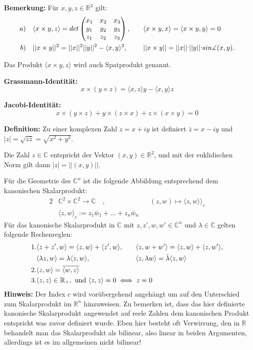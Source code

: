 \documentclass{article}
\let\oldcdot\cdot
\renewcommand{\cdot}{\raisebox{0.1ex}{$\oldcdot$}}
\begin{document}
\textbf{Bemerkung:} Für $x,y,z\in\mathbb{R}^3$ gilt:
\begin{alignat*}{2}
	a)\quad&\langle x\times y, z\rangle=det
	\begin{pmatrix}
		x_1&x_2&x_3\\
		y_1&y_2&y_3\\
		z_1&z_2&z_3
	\end{pmatrix},\quad&&
	\langle x\times y,x\rangle = \langle x\times y, y\rangle =0\\
	b)\quad&||x\times y||^2=||x||^2||y||^2-\langle x,y\rangle^2, && 
	||x\times y||=||x||\cdot||y||\cdot sin\measuredangle(x,y).
\end{alignat*}

Das Produkt $\langle x\times y,z\rangle$ wird auch Spatprodukt genannt.

\textbf{Grassmann-Identität:}
\begin{equation*}
	x\times (y\times z) = \langle x,z\rangle y - \langle x,y\rangle z
\end{equation*}

\textbf{Jacobi-Identität:}
\begin{equation*}
	x\times(y\times z)+y\times(z\times x)+z\times(x\times y)=0
\end{equation*}

\textbf{Definition:} Zu einer komplexen Zahl $z=x+iy$ ist definiert
$\bar{z}=x-iy$ und $|z|=\sqrt{z\bar{z}} =\sqrt{x^2+y^2}$. 

Die Zahl $z\in\mathbb{C}$ entspricht der Vektor $(x,y)\in\mathbb{R}^2$, und mit
der euklidischen Norm gilt dann $|z|=||(x,y)||$.

Für die Geometrie des $\mathbb{C}^n$ ist die folgende Abbildung entsprechend
dem kanonischen Skalarprodukt:
\begin{alignat*}{2}
	&\mathbb{C}^2\times \mathbb{C}^2\to\mathbb{C}\quad, &&
	(z,w)\mapsto\langle z,w\rangle\rangle_c\\
	&\langle z,w\rangle_c:=z_1\bar{w}_1+\dots+z_n\bar{w}_n
\end{alignat*}
Für das kanonische Skalarprodukt in $\mathbb{C}$ mit $z,z',w,w'\in\mathbb{C}^n$
und $\lambda\in\mathbb{C}$ gelten folgende Rechenreglen:
\begin{alignat*}{2}
	1.&\langle z+z',w\rangle = \langle z,w\rangle + \langle
	z',w\rangle,\quad&&
	\langle z,w+w'\rangle = \langle z,w\rangle + \langle z,w'\rangle,\\
	&\langle \lambda z,w\rangle=\lambda\langle z,w\rangle,&&
	\langle z,\lambda w\rangle=\bar\lambda\langle z,w\rangle\\
	2.&\langle z,w\rangle = \overline{\langle w,z\rangle}\\
	3.&\mathrlap{\langle z,z\rangle \in\mathbb{R}_+,\text{ und }\langle
	z,z\rangle
	=0\iff z=0}
\end{alignat*}
\textbf{Hinweis:} Der Index $c$ wird vorübergehend angehängt um auf den
Unterschied zum Skalarprodukt im $\mathbb{R}^n$ hinzuweisen. Zu bemerken ist,
dass das hier definierte kanonische Skalarprodukt angewendet auf reele Zahlen
dem kanonischen Produkt entspricht was zuvor definiert wurde. Eben hier besteht
oft Verwirrung, den in $\mathbb{R}$ behandelt man das Skalarprodukt als
bilinear, also linear in beiden Argumenten, allerdings ist es im allgemeinen
nicht bilinear!
\end{document}
